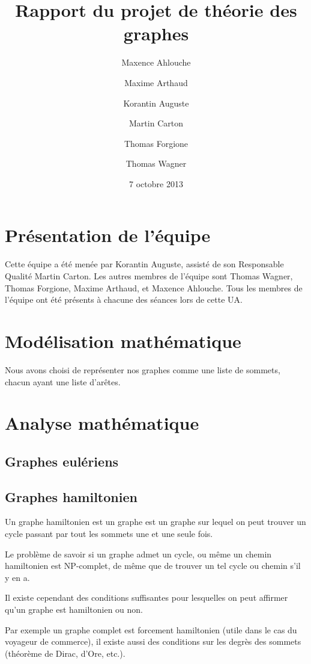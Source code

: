 \documentclass{scrartcl}
\begin{document}
\title{Rapport du projet de théorie des graphes}
\author{Maxence Ahlouche \and Maxime Arthaud \and Korantin Auguste
          \and Martin Carton \and Thomas Forgione \and Thomas Wagner}
\date{7 octobre 2013}
\maketitle
\tableofcontents
\lstlistoflistings
\newpage

\section{Présentation de l'équipe}
  Cette équipe a été menée par Korantin Auguste, assisté de son Responsable
  Qualité Martin Carton. Les autres membres de l'équipe sont Thomas Wagner,
  Thomas Forgione, Maxime Arthaud, et Maxence Ahlouche.  Tous les membres de
  l'équipe ont été présents à chacune des séances lors de cette UA.

\section{Modélisation mathématique}
  Nous avons choisi de représenter nos graphes comme une liste de sommets,
  chacun ayant une liste d'arêtes.

\section{Analyse mathématique}
  \subsection{Graphes eulériens}
  \subsection{Graphes hamiltonien}
    Un graphe hamiltonien est un graphe est un graphe sur lequel on peut
    trouver un cycle passant par tout les sommets une et une seule fois.

    Le problème de savoir si un graphe admet un cycle, ou même un chemin
    hamiltonien est NP-complet, de même que de trouver un tel cycle ou chemin
    s'il y en a.

    Il existe cependant des conditions suffisantes pour lesquelles on peut
    affirmer qu'un graphe est hamiltonien ou non.

    Par exemple un graphe complet est forcement hamiltonien (utile dans le cas
    du voyageur de commerce), il existe aussi des conditions sur les degrès des
    sommets (théorème de Dirac, d'Ore, etc.).
\end{document}
